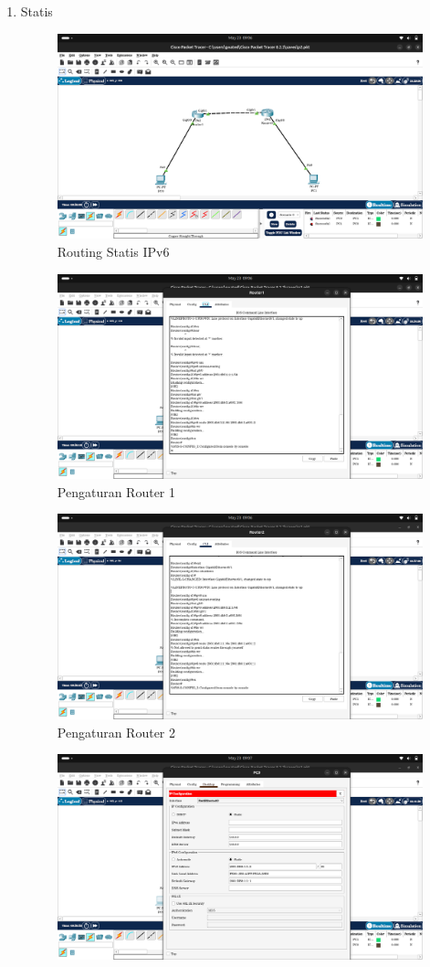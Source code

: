 \begin{enumerate}
    \item  Statis
    \begin{figure}[H]
        \centering
        \includegraphics[width=0.5\linewidth]{static.png}
        \caption{Routing Statis IPv6}
        \label{fig:gambar1}
    \end{figure}
    \begin{figure}[H]
        \centering
        \includegraphics[width=0.5\linewidth]{router1static.png}
        \caption{Pengaturan Router 1}
        \label{fig:gambar1}
    \end{figure}
    \begin{figure}[H]
        \centering
        \includegraphics[width=0.5\linewidth]{router2static.png}
        \caption{Pengaturan Router 2}
        \label{fig:gambar1}
    \end{figure}
    \begin{figure}[H]
        \centering
        \includegraphics[width=0.5\linewidth]{pc0static.png}

\end{figure}
\end{enumerate}

